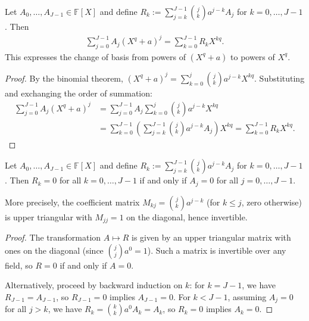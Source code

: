 \begin{lemma}\label{lem:coefficient-transformation-shift} \leanok {}
  Let $A_0, \ldots, A_{J-1} \in \mathbb{F}[X]$ and define $R_k := \sum_{j=k}^{J-1} \binom{j}{k} a^{j-k} A_j$ for $k = 0, \ldots, J-1$. Then
  \begin{align*}
    \sum_{j=0}^{J-1} A_j (X^q + a)^j = \sum_{k=0}^{J-1} R_k X^{kq}.
  \end{align*}
  This expresses the change of basis from powers of $(X^q + a)$ to powers of $X^q$.
\end{lemma}
\begin{proof} \leanok
  By the binomial theorem, $(X^q + a)^j = \sum_{k=0}^{j} \binom{j}{k} a^{j-k} X^{kq}$. Substituting and exchanging the order of summation:
  \begin{align*}
    \sum_{j=0}^{J-1} A_j (X^q + a)^j & = \sum_{j=0}^{J-1} A_j \sum_{k=0}^{j} \binom{j}{k} a^{j-k} X^{kq}                                               \\
                                     & = \sum_{k=0}^{J-1} \left(\sum_{j=k}^{J-1} \binom{j}{k} a^{j-k} A_j\right) X^{kq} = \sum_{k=0}^{J-1} R_k X^{kq}.
  \end{align*}
\end{proof}

\begin{lemma}\label{lem:triangular-inversion-shift} \leanok {}
  Let $A_0, \ldots, A_{J-1} \in \mathbb{F}[X]$ and define $R_k := \sum_{j=k}^{J-1} \binom{j}{k} a^{j-k} A_j$ for $k = 0, \ldots, J-1$. Then $R_k = 0$ for all $k = 0, \ldots, J-1$ if and only if $A_j = 0$ for all $j = 0, \ldots, J-1$.

  More precisely, the coefficient matrix $M_{kj} = \binom{j}{k} a^{j-k}$ (for $k \leq j$, zero otherwise) is upper triangular with $M_{jj} = 1$ on the diagonal, hence invertible.
\end{lemma}
\begin{proof} \leanok
  The transformation $A \mapsto R$ is given by an upper triangular matrix with ones on the diagonal (since $\binom{j}{j} a^0 = 1$). Such a matrix is invertible over any field, so $R = 0$ if and only if $A = 0$.

  Alternatively, proceed by backward induction on $k$: for $k = J-1$, we have $R_{J-1} = A_{J-1}$, so $R_{J-1} = 0$ implies $A_{J-1} = 0$. For $k < J-1$, assuming $A_j = 0$ for all $j > k$, we have $R_k = \binom{k}{k} a^0 A_k = A_k$, so $R_k = 0$ implies $A_k = 0$.
\end{proof}

